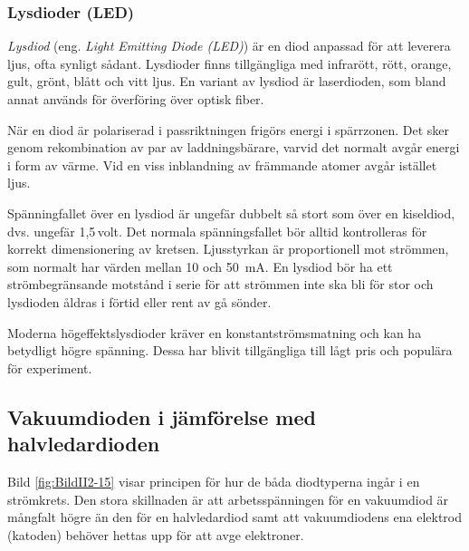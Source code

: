 \subsubsection{Lysdioder (LED)}
\label{diod_led}

\emph{Lysdiod} (eng. \emph{Light Emitting Diode (LED)}) är en diod anpassad för
att leverera ljus, ofta synligt sådant.
Lysdioder finns tillgängliga med infrarött, rött, orange, gult, grönt,
blått och vitt ljus.
En variant av lysdiod är laserdioden, som bland annat används för överföring
över optisk fiber.

När en diod är polariserad i passriktningen frigörs energi i spärrzonen.
Det sker genom rekombination av par av laddningsbärare, varvid det normalt avgår
energi i form av värme.
Vid en viss inblandning av främmande atomer avgår istället ljus.

Spänningfallet över en lysdiod är ungefär dubbelt så stort som över en
kiseldiod, dvs. ungefär 1,5\,volt.
Det normala spänningsfallet bör alltid kontrolleras för korrekt dimensionering
av kretsen.
Ljusstyrkan är proportionell mot strömmen, som normalt har värden mellan 10 och
\SI{50}{\milli\ampere}.
En lysdiod bör ha ett strömbegränsande motstånd i serie för att strömmen
inte ska bli för stor och lysdioden åldras i förtid eller rent av gå sönder.

Moderna högeffektslysdioder kräver en konstant\-strömsmatning och kan ha betydligt
högre spänning.
Dessa har blivit tillgängliga till lågt pris och populära för experiment.

\subsection{Vakuumdioden i jämförelse med halvledardioden}


Bild \ref{fig:BildII2-15} visar principen för hur de båda diodtyperna ingår i
en strömkrets.
Den stora skillnaden är att arbetsspänningen för en vakuumdiod är
mångfalt högre än den för en halvledardiod samt att vakuumdiodens ena
elektrod (katoden) behöver hettas upp för att avge elektroner.
